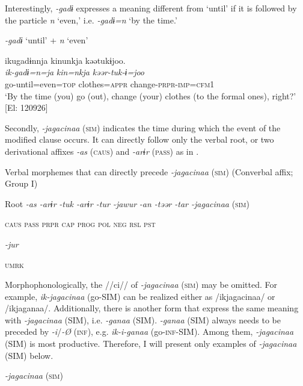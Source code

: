 Interestingly, \textit{-gadɨ} expresses a meaning different from ‘until’ if it is followed by the particle \textit{n} ‘even,’ i.e. \textit{-gadɨ=n} ‘by the time.’

\ea\label{ex:8-96}
  \textit{-gadɨ} ‘until’ + \textit{n} ‘even’

{\MS}
\glll ikugadɨnnja  kinunkja  kəətukɨjoo.\\
    \textit{ik-gadɨ=n=ja}  \textit{kin=nkja}  \textit{kəər-tuk-ɨ=joo}\\
    go-until=even=\textsc{top}  clothes=\textsc{appr}  change-\textsc{prpr}-\textsc{imp}=\textsc{cfm1}\\
\glt ‘By the time (you) go (out), change (your) clothes (to the formal ones), right?’ [El: 120926]
\z

  Secondly, \textit{-jagacinaa} (\textsc{sim}) indicates the time during which the event of the modified clause occurs. It can directly follow only the verbal root, or two derivational affixes \textit{-as} (\textsc{caus}) and \textit{-arɨr} (\textsc{pass}) as in .

\ea\label{ex:8-97}
  Verbal morphemes that can directly precede \textit{-jagacinaa} (\textsc{sim}) (Converbal affix; Group I)

  Root  \textit{-as  -arɨr} %
\textit{-tuk  -arɨr  -tur  -jawur} %
\textit{-an  -təər  -tar  -jagacinaa} (\textsc{sim})

    \textsc{caus}  \textsc{pass}  \textsc{prpr}  \textsc{cap}  \textsc{prog}  \textsc{pol}  \textsc{neg}  \textsc{rsl}  \textsc{pst}

          \textit{-jur}

          \textsc{umrk}
\z

Morphophonologically, the //ci// of \textit{-jagacinaa} (\textsc{sim}) may be omitted. For example, \textit{ik-jagacinaa} (go-SIM) can be realized either as /ikjagacinaa/ or /ikjaganaa/. Additionally, there is another form that express the same meaning with \textit{-jagacinaa} (SIM), i.e. \textit{-ganaa} (SIM). \textit{-ganaa} (SIM) always needs to be preceded by \textit{-i}/\textit{-Ø} (\textsc{inf}), e.g. \textit{ik-i-ganaa} (go-\textsc{inf}-SIM). Among them, \textit{-jagacinaa} (SIM) is most productive. Therefore, I will present only examples of \textit{-jagacinaa} (SIM) below.

\ea\label{ex:8-98}
  \textit{-jagacinaa} (\textsc{sim})

